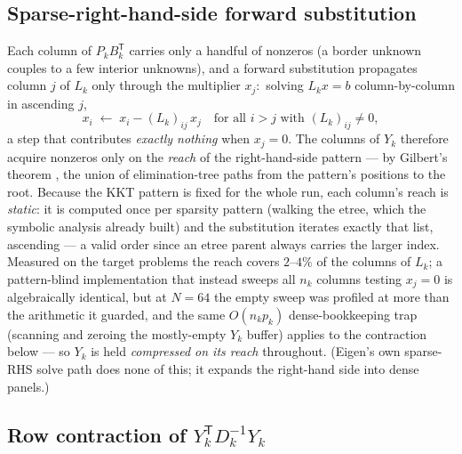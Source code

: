 \documentclass[11pt]{article}
\begin{document}
\subsection{Sparse-right-hand-side forward substitution}
\label{sec:sparse-fwd}

Each column of $P_k B_k^{\mathsf T}$ carries only a handful of nonzeros (a
border unknown couples to a few interior unknowns), and a forward
substitution propagates column $j$ of $L_k$ only through the multiplier
$x_j$:\ solving $L_k x = b$ column-by-column in ascending $j$,
\[
  x_i \;\leftarrow\; x_i - (L_k)_{ij}\, x_j
  \quad\text{for all } i > j \text{ with } (L_k)_{ij}\ne 0,
\]
a step that contributes \emph{exactly nothing} when $x_j = 0$.  The columns
of $Y_k$ therefore acquire nonzeros only on the \emph{reach} of the
right-hand-side pattern --- by Gilbert's theorem \cite{gilbert1988}, the
union of elimination-tree paths from the pattern's positions to the root.
Because the KKT pattern is fixed for the whole run, each column's reach is
\emph{static}: it is computed once per sparsity pattern (walking the etree,
which the symbolic analysis already built) and the substitution iterates
exactly that list, ascending --- a valid order since an etree parent always
carries the larger index.  Measured on the target problems the reach covers
$2$--$4\%$ of the columns of $L_k$; a pattern-blind implementation that
instead sweeps all $n_k$ columns testing $x_j = 0$ is algebraically
identical, but at $N=64$ the empty sweep was profiled at more than the
arithmetic it guarded, and the same $O(n_k p_k)$ dense-bookkeeping trap
(scanning and zeroing the mostly-empty $Y_k$ buffer) applies to the
contraction below --- so $Y_k$ is held \emph{compressed on its reach}
throughout.  (Eigen's own sparse-RHS solve path does none of this; it
expands the right-hand side into dense panels.)

\subsection{Row contraction of \texorpdfstring{$Y_k^{\mathsf T} D_k^{-1} Y_k$}{YtDinvY}}
\label{sec:row-contraction}
\end{document}
